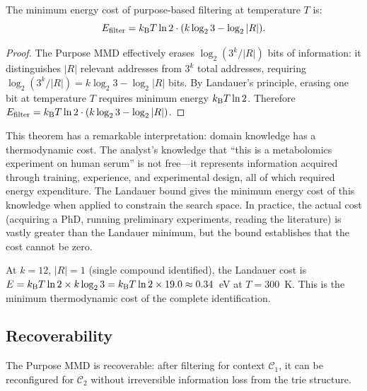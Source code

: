 \begin{theorem}
\label{thm:ch24-landauer}
The minimum energy cost of purpose-based filtering at temperature $T$ is:
\begin{equation}
\label{eq:ch24-landauer}
  E_{\mathrm{filter}} = k_{\mathrm{B}} T \ln 2 \cdot (k \log_2 3 - \log_2 |R|).
\end{equation}
\end{theorem}

\begin{proof}
The Purpose MMD effectively erases $\log_2(3^k/|R|)$ bits of information:
it distinguishes $|R|$ relevant addresses from $3^k$ total addresses, requiring
$\log_2(3^k/|R|) = k\log_2 3 - \log_2|R|$ bits.  By Landauer's principle,
erasing one bit at temperature $T$ requires minimum energy $k_{\mathrm{B}} T \ln 2$.
Therefore $E_{\mathrm{filter}} = k_{\mathrm{B}} T \ln 2 \cdot (k\log_2 3 - \log_2|R|)$.
\end{proof}

\begin{remark}
This theorem has a remarkable interpretation: domain knowledge has a
thermodynamic cost.  The analyst's knowledge that ``this is a metabolomics
experiment on human serum'' is not free---it represents information acquired
through training, experience, and experimental design, all of which required
energy expenditure.  The Landauer bound gives the minimum energy cost of this
knowledge when applied to constrain the search space.  In practice, the actual
cost (acquiring a PhD, running preliminary experiments, reading the literature)
is vastly greater than the Landauer minimum, but the bound establishes that the
cost cannot be zero.

At $k = 12$, $|R| = 1$ (single compound identified), the Landauer cost is
$E = k_{\mathrm{B}} T \ln 2 \times k \log_2 3 = k_{\mathrm{B}} T \ln 2 \times 19.0 \approx 0.34$~eV
at $T = 300$~K.  This is the minimum thermodynamic cost of the complete
identification.
\end{remark}

\subsection{Recoverability}
\label{sec:ch24-recover}

\begin{proposition}
\label{prop:ch24-recover}
The Purpose MMD is recoverable: after filtering for context $\mathcal{C}_1$,
it can be reconfigured for $\mathcal{C}_2$ without irreversible information
loss from the trie structure.
\end{proposition}

